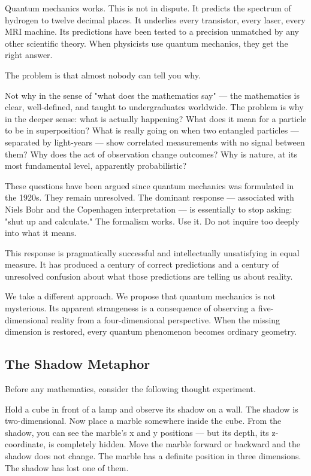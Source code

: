 \documentclass[aps,prd,preprint,superscriptaddress,longbibliography,floatfix]{revtex4-2}
\theoremstyle{remark}
\begin{document}
Quantum mechanics works. This is not in dispute. It predicts the spectrum of hydrogen to twelve decimal places. It underlies every transistor, every laser, every MRI machine. Its predictions have been tested to a precision unmatched by any other scientific theory. When physicists use quantum mechanics, they get the right answer.

The problem is that almost nobody can tell you why.

Not why in the sense of "what does the mathematics say" --- the mathematics is clear, well-defined, and taught to undergraduates worldwide. The problem is why in the deeper sense: what is actually happening? What does it mean for a particle to be in superposition? What is really going on when two entangled particles --- separated by light-years --- show correlated measurements with no signal between them? Why does the act of observation change outcomes? Why is nature, at its most fundamental level, apparently probabilistic?

These questions have been argued since quantum mechanics was formulated in the 1920s. They remain unresolved. The dominant response --- associated with Niels Bohr and the Copenhagen interpretation --- is essentially to stop asking: "shut up and calculate." The formalism works. Use it. Do not inquire too deeply into what it means.

This response is pragmatically successful and intellectually unsatisfying in equal measure. It has produced a century of correct predictions and a century of unresolved confusion about what those predictions are telling us about reality.

We take a different approach. We propose that quantum mechanics is not mysterious. Its apparent strangeness is a consequence of observing a five-dimensional reality from a four-dimensional perspective. When the missing dimension is restored, every quantum phenomenon becomes ordinary geometry.



\subsection{The Shadow Metaphor}

Before any mathematics, consider the following thought experiment.

Hold a cube in front of a lamp and observe its shadow on a wall. The shadow is two-dimensional. Now place a marble somewhere inside the cube. From the shadow, you can see the marble's x and y positions --- but its depth, its z-coordinate, is completely hidden. Move the marble forward or backward and the shadow does not change. The marble has a definite position in three dimensions. The shadow has lost one of them.
\end{document}
